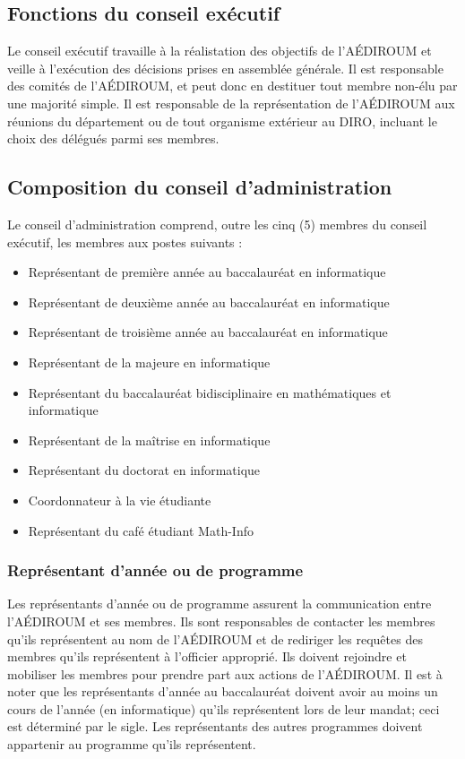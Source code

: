 \documentclass[12pt]{article}
\begin{document}
\subsection{Fonctions du conseil exécutif}

Le conseil exécutif travaille à la réalistation des objectifs de l'AÉDIROUM et veille à l'exécution des décisions prises en assemblée générale. Il est responsable des comités de l'AÉDIROUM, et peut donc en destituer tout membre non-élu par une majorité simple. Il est responsable de la représentation de l'AÉDIROUM aux réunions du département ou de tout organisme extérieur au DIRO, incluant le choix des délégués parmi ses membres.

\subsection{Composition du conseil d'administration}

Le conseil d'administration comprend, outre les cinq (5) membres du conseil exécutif, les membres aux postes suivants :
\begin{itemize}
\item Représentant de première année au baccalauréat en informatique
\item Représentant de deuxième année au baccalauréat en informatique
\item Représentant de troisième année au baccalauréat en informatique
\item Représentant de la majeure en informatique
\item Représentant du baccalauréat bidisciplinaire en mathématiques et informatique
\item Représentant de la maîtrise en informatique
\item Représentant du doctorat en informatique
\item Coordonnateur à la vie étudiante
\item Représentant du café étudiant Math-Info
\end{itemize}

\subsubsection{Représentant d'année ou de programme}

Les représentants d'année ou de programme assurent la communication entre l'AÉDIROUM et ses membres. Ils sont responsables de contacter les membres qu'ils représentent au nom de l'AÉDIROUM et de rediriger les requêtes des membres qu'ils représentent à l'officier approprié. Ils doivent rejoindre et mobiliser les membres pour prendre part aux actions de l'AÉDIROUM. Il est à noter que les représentants d'année au baccalauréat doivent avoir au moins un cours de l'année (en informatique) qu'ils représentent lors de leur mandat; ceci est déterminé par le sigle. Les représentants des autres programmes doivent appartenir au programme qu'ils représentent.
\end{document}

